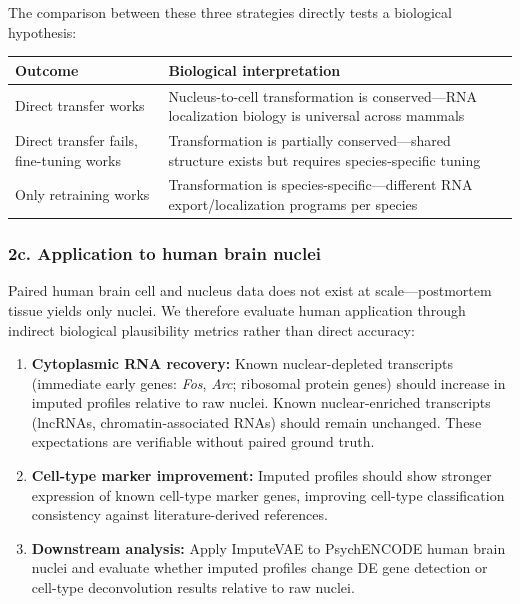 \documentclass[11pt]{article}
\begin{document}
The comparison between these three strategies directly tests a biological hypothesis:

\begin{table}[h]
\centering
\begin{tabular}{lp{10cm}}
\toprule
\textbf{Outcome} & \textbf{Biological interpretation} \\
\midrule
Direct transfer works & Nucleus-to-cell transformation is conserved---RNA localization biology is universal across mammals \\
Direct transfer fails, fine-tuning works & Transformation is partially conserved---shared structure exists but requires species-specific tuning \\
Only retraining works & Transformation is species-specific---different RNA export/localization programs per species \\
\bottomrule
\end{tabular}
\end{table}

\subsubsection*{2c. Application to human brain nuclei}

Paired human brain cell and nucleus data does not exist at scale---postmortem tissue yields only nuclei. We therefore evaluate human application through indirect biological plausibility metrics rather than direct accuracy:

\begin{enumerate}[nosep]
    \item \textbf{Cytoplasmic RNA recovery:} Known nuclear-depleted transcripts (immediate early genes: \textit{Fos}, \textit{Arc}; ribosomal protein genes) should increase in imputed profiles relative to raw nuclei. Known nuclear-enriched transcripts (lncRNAs, chromatin-associated RNAs) should remain unchanged. These expectations are verifiable without paired ground truth.

    \item \textbf{Cell-type marker improvement:} Imputed profiles should show stronger expression of known cell-type marker genes, improving cell-type classification consistency against literature-derived references.

    \item \textbf{Downstream analysis:} Apply ImputeVAE to PsychENCODE human brain nuclei and evaluate whether imputed profiles change DE gene detection or cell-type deconvolution results relative to raw nuclei.
\end{enumerate}
\end{document}
